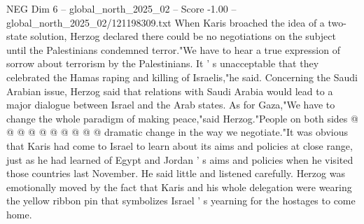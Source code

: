 \begin{textsample}{NEG Dim 6 – global\_north\_2025\_02 – Score -1.00 – global\_north\_2025\_02/121198309.txt}
When Karis broached the idea of a two-state solution, Herzog declared there could be no negotiations on the subject until the Palestinians condemned terror."We have to hear a true expression of sorrow about terrorism by the Palestinians.
It ' s unacceptable that they celebrated the Hamas raping and killing of Israelis,"he said.
Concerning the Saudi Arabian issue, Herzog said that relations with Saudi Arabia would lead to a major dialogue between Israel and the Arab states.
As for Gaza,"We have to change the whole paradigm of making peace,"said Herzog."People on both sides @ @ @ @ @ @ @ @ @ @ dramatic change in the way we negotiate."It was obvious that Karis had come to Israel to learn about its aims and policies at close range, just as he had learned of Egypt and Jordan ' s aims and policies when he visited those countries last November.
He said little and listened carefully.
Herzog was emotionally moved by the fact that Karis and his whole delegation were wearing the yellow ribbon pin that symbolizes Israel ' s yearning for the hostages to come home.

\end{textsample}
